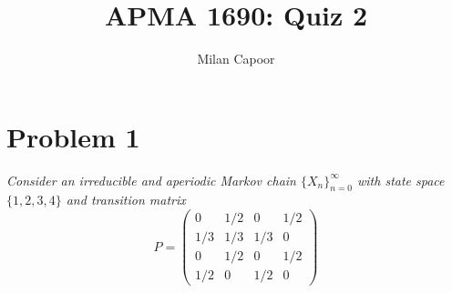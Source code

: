 \documentclass[12pt]{article}
\title{APMA 1690: Quiz 2}
\author{Milan Capoor}
\date{}
\begin{document}
\maketitle
\section*{Problem 1}
    \emph{Consider an irreducible and aperiodic Markov chain $\{X_n\}_{n=0}^\infty$ with state space $\{1, 2, 3, 4\}$ and transition matrix}
    \[P = \begin{pmatrix}
        0 & 1/2 & 0 & 1/2\\
        1/3 & 1/3 & 1/3 & 0\\
        0 & 1/2 & 0 & 1/2\\
        1/2 & 0 & 1/2 & 0
    \end{pmatrix}\]
\end{document}
